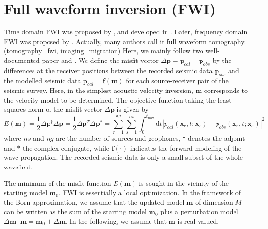 \section{Full waveform inversion (FWI) }

Time domain FWI was proposed by \cite{tarantola1984inversion}, and developed in \cite{tarantola1986strategy,pica1990nonlinear}. Later, frequency domain FWI was proposed by \cite{pratt1998gauss}. Actually, many authors call it full waveform tomography. (tomography=fwi, imaging=migration) Here, we mainly follow two well-documented paper \cite{pratt1998gauss} and  \cite{virieux2009overview}. We define the misfit vector $\Delta \textbf{p}=\textbf{p}_{cal}-\textbf{p}_{obs}$ by the differences at the receiver positions between the recorded seismic data $\textbf{p}_{obs}$ and the modelled seismic data $\textbf{p}_{cal}=\textbf{f}(\textbf{m})$ for each source-receiver pair of the seismic survey. Here, in the simplest acoustic velocity inversion, $\textbf{m}$ corresponds to the velocity model to be determined. The objective function taking the least-squares norm of the misfit vector $\Delta \textbf{p}$ is given by
\begin{equation}\label{eq:obj}
E(\textbf{m})=\frac{1}{2}\Delta \textbf{p}^{\dagger}\Delta \textbf{p}
=\frac{1}{2}\Delta \textbf{p}^T\Delta \textbf{p}^*
=\sum_{r=1}^{ng}\sum_{s=1}^{ns}\int_{0}^{t_{\max}}\mathrm{d}t|p_{cal}(\textbf{x}_r, t;\textbf{x}_s)-p_{obs}(\textbf{x}_r, t;\textbf{x}_s)|^2
\end{equation}
where $ns$ and $ng$ are the number of sources and geophones, $\dagger$ denotes the adjoint and $*$ the complex conjugate, while $\textbf{f}(\cdot)$ indicates the forward modeling of the wave propagation. The recorded seismic data is only a small subset of the whole wavefield.


The minimum of the misfit function $E(\textbf{m})$ is sought in the vicinity of the starting model $\textbf{m}_0$. FWI is essentially a local optimization.
In the framework of the Born approximation, we assume that the updated model $\textbf{m}$ of dimension $M$ can be written as the sum of the starting model $\textbf{m}_0$ plus a perturbation model $\Delta \textbf{m}$: $\textbf{m}=\textbf{m}_0+\Delta \textbf{m}$. In the following, we assume that $\textbf{m}$ is real valued.

